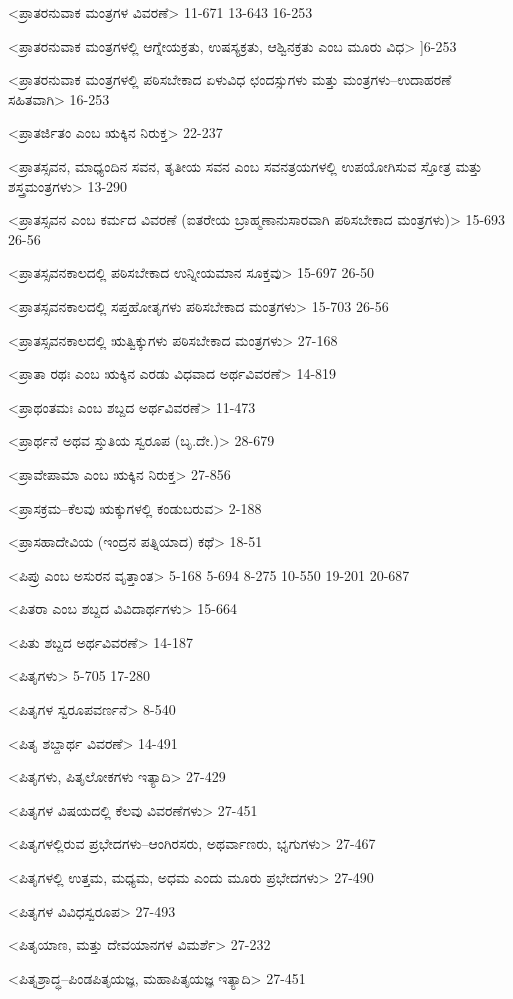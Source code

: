 <ಪ್ರಾತರನುವಾಕ ಮಂತ್ರಗಳ ವಿವರಣೆ>
11-671 
13-643
16-253

<ಪ್ರಾತರನುವಾಕ ಮಂತ್ರಗಳಲ್ಲಿ ಆಗ್ನೇಯಕ್ರತು, ಉಷಸ್ಯಕ್ರತು, ಆಶ್ವಿನಕ್ರತು ಎಂಬ ಮೂರು ವಿಧ>
]6-253

<ಪ್ರಾತರನುವಾಕ ಮಂತ್ರಗಳಲ್ಲಿ ಪಠಿಸಬೇಕಾದ ಏಳುವಿಧ ಛಂದಸ್ಸುಗಳು ಮತ್ತು ಮಂತ್ರಗಳು–ಉದಾಹರಣೆ ಸಹಿತವಾಗಿ>
16-253

<ಪ್ರಾತರ್ಜಿತಂ ಎಂಬ ಋಕ್ಕಿನ ನಿರುಕ್ತ>
22-237

<ಪ್ರಾತಸ್ಸವನ, ಮಾಧ್ಯಂದಿನ ಸವನ, ತೃತೀಯ ಸವನ ಎಂಬ ಸವನತ್ರಯಗಳಲ್ಲಿ ಉಪಯೋಗಿಸುವ ಸ್ತೋತ್ರ ಮತ್ತು ಶಸ್ತ್ರಮಂತ್ರಗಳು>
13-290

<ಪ್ರಾತಸ್ಸವನ ಎಂಬ ಕರ್ಮದ ವಿವರಣೆ (ಐತರೇಯ ಬ್ರಾಹ್ಮಣಾನುಸಾರವಾಗಿ ಪಠಿಸಬೇಕಾದ ಮಂತ್ರಗಳು)>
15-693
26-56

<ಪ್ರಾತಸ್ಸವನಕಾಲದಲ್ಲಿ ಪಠಿಸಬೇಕಾದ ಉನ್ನೀಯಮಾನ ಸೂಕ್ತವು>
15-697
26-50

<ಪ್ರಾತಸ್ಸವನಕಾಲದಲ್ಲಿ ಸಪ್ತಹೋತೃಗಳು ಪಠಿಸಬೇಕಾದ ಮಂತ್ರಗಳು>
15-703
26-56

<ಪ್ರಾತಸ್ಸವನಕಾಲದಲ್ಲಿ ಋತ್ವಿಕ್ಕುಗಳು ಪಠಿಸಬೇಕಾದ ಮಂತ್ರಗಳು>
27-168

<ಪ್ರಾತಾ ರಥಃ ಎಂಬ ಋಕ್ಕಿನ ಎರಡು ವಿಧವಾದ ಅರ್ಥವಿವರಣೆ>
14-819

<ಪ್ರಾಥಂತಮಃ ಎಂಬ ಶಬ್ದದ ಅರ್ಥವಿವರಣೆ>
11-473

<ಪ್ರಾರ್ಥನೆ ಅಥವ ಸ್ತುತಿಯ ಸ್ವರೂಪ (ಬೃ.ದೇ.)>
28-679

<ಪ್ರಾವೇಪಾಮಾ ಎಂಬ ಋಕ್ಕಿನ ನಿರುಕ್ತ>
27-856

<ಪ್ರಾಸಕ್ರಮ–ಕೆಲವು ಋಕ್ಕುಗಳಲ್ಲಿ ಕಂಡುಬರುವ>
2-188

<ಪ್ರಾಸಹಾದೇವಿಯ (ಇಂದ್ರನ ಪತ್ನಿಯಾದ) ಕಥೆ>
18-51

<ಪಿಪ್ರು ಎಂಬ ಅಸುರನ ವೃತ್ತಾಂತ>
5-168 
5-694 
8-275 
10-550 
19-201
20-687

<ಪಿತರಾ ಎಂಬ ಶಬ್ದದ ವಿವಿದಾರ್ಥಗಳು>
15-664

<ಪಿತು ಶಬ್ದದ ಅರ್ಥವಿವರಣೆ>
14-187

<ಪಿತೃಗಳು>
5-705
17-280


<ಪಿತೃಗಳ ಸ್ವರೂಪವರ್ಣನೆ>
8-540

<ಪಿತೃ ಶಬ್ದಾರ್ಥ ವಿವರಣೆ>
14-491

<ಪಿತೃಗಳು, ಪಿತೃಲೋಕಗಳು ಇತ್ಯಾದಿ>
27-429

<ಪಿತೃಗಳ ವಿಷಯದಲ್ಲಿ ಕೆಲವು ವಿವರಣೆಗಳು>
27-451

<ಪಿತೃಗಳಲ್ಲಿರುವ ಪ್ರಭೇದಗಳು–ಆಂಗಿರಸರು, ಅಥರ್ವಾಣರು, ಭೃಗುಗಳು>
27-467

<ಪಿತೃಗಳಲ್ಲಿ ಉತ್ತಮ, ಮಧ್ಯಮ, ಅಧಮ ಎಂದು ಮೂರು ಪ್ರಭೇದಗಳು>
27-490

<ಪಿತೃಗಳ ವಿವಿಧಸ್ವರೂಪ>
27-493

<ಪಿತೃಯಾಣ, ಮತ್ತು ದೇವಯಾನಗಳ ವಿಮರ್ಶೆ>
27-232

<ಪಿತೃಶ್ರಾದ್ಧ–ಪಿಂಡಪಿತೃಯಜ್ಞ, ಮಹಾಪಿತೃಯಜ್ಞ ಇತ್ಯಾದಿ>
27-451

